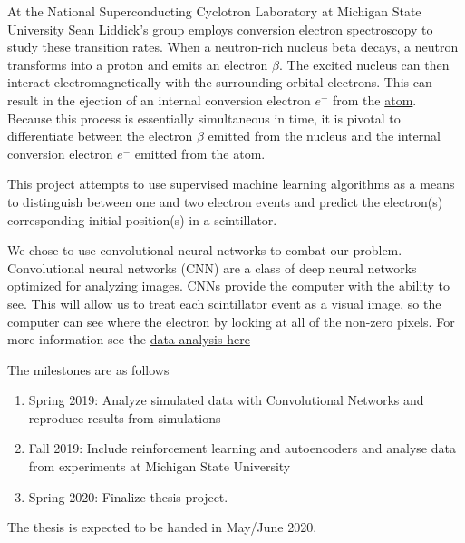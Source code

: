 \documentclass[%
oneside,                 %
final,                   %
10pt]{article}
\begin{document}
At the National Superconducting Cyclotron Laboratory at Michigan State University Sean Liddick's group employs conversion electron spectroscopy to study
these transition rates. When a neutron-rich nucleus beta decays, a
neutron transforms into a proton and emits an electron $\beta$. The
excited nucleus can then interact electromagnetically with the
surrounding orbital electrons. This can result in the ejection of an
internal conversion electron $e^{-}$ from the
\href{{https://www.sciencedirect.com/science/article/pii/S0065253908608884}}{atom}.
Because this process is essentially simultaneous in time, it is pivotal
to differentiate between the electron $\beta$ emitted from the
nucleus and the internal conversion electron $e^{-}$ emitted from
the atom.

This project attempts to use supervised machine learning algorithms as a
means to distinguish between one and two electron events and predict the
electron(s) corresponding initial position(s) in a scintillator.


We chose to use convolutional neural networks to combat our problem.
Convolutional neural networks (CNN) are a class of deep neural networks
optimized for analyzing images. CNNs provide the computer with the
ability to see. This will allow us to treat each scintillator event as a
visual image, so the computer can see where the electron by looking at
all of the non-zero pixels. 
For more information see the \href{{https://github.com/harrisonlabollita/Harrison-LaBollita/tree/master/Machine\%20Learning}}{data analysis here}

The milestones are as follows
\begin{enumerate}
\item Spring 2019: Analyze simulated data with Convolutional Networks and reproduce results from simulations

\item Fall 2019: Include reinforcement learning and autoencoders and analyse data from experiments at Michigan State University

\item Spring 2020: Finalize thesis project.
\end{enumerate}

\noindent
The thesis is expected to be handed in May/June  2020.



\end{document}
